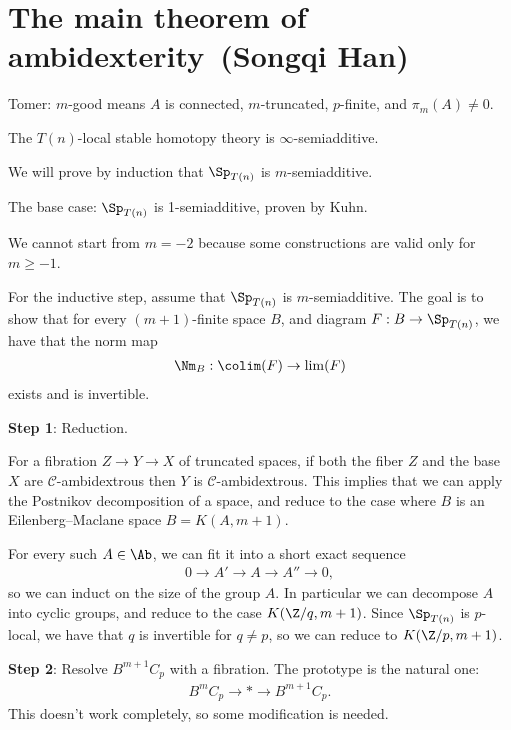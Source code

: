 \renewcommand{\thespeaker}{Songqi Han}
\renewcommand{\thetitle}{The main theorem of ambidexterity}

\section{\thetitle~(\thespeaker)}

Tomer: $m$-good means $A$ is connected, $m$-truncated, $p$-finite, and $\pi_m(A) \ne 0$.


\begin{theorem} The $T(n)$-local stable homotopy theory is $\infty$-semiadditive.
\end{theorem}

We will prove by induction that $\Sp_{T(n)}$ is $m$-semiadditive.

The base case: $\Sp_{T(n)}$ is 1-semiadditive, proven by Kuhn.

\begin{remark} We cannot start from $m=-2$ because some constructions are valid only for $m\ge -1$.
\end{remark}

For the inductive step, assume that $\Sp_{T(n)}$ is $m$-semiadditive. The goal is to show that for every $(m+1)$-finite space $B$, and diagram $F: B \to \Sp_{T(n)}$, we have that the norm map
\begin{align*}
    \Nm_B : \colim(F) \to \lim(F)
\end{align*}
exists and is invertible.

\textbf{Step 1}: Reduction.

For a fibration $Z \to Y \to X$ of truncated spaces, if both the fiber $Z$ and the base $X$ are $\mathscr{C}$-ambidextrous then $Y$ is $\mathscr{C}$-ambidextrous. This implies that we can apply the Postnikov decomposition of a space, and reduce to the case where $B$ is an Eilenberg--Maclane space $B = K(A,m+1)$.

For every such $A\in \Ab$, we can fit it into a short exact sequence
\begin{align*}
    0 \to A' \to A \to A'' \to 0,
\end{align*}
so we can induct on the size of the group $A$. In particular we can decompose $A$ into cyclic groups, and reduce to the case $K(\Z/q, m+1)$. Since $\Sp_{T(n)}$ is $p$-local, we have that $q$ is invertible for $q\ne p$, so we can reduce to $K(\Z/p, m+1)$.

\textbf{Step 2}: Resolve $B^{m+1} C_p$ with a fibration. The prototype is the natural one:
\begin{align*}
    B^m C_p \to \ast \to B^{m+1} C_p.
\end{align*}
This doesn't work completely, so some modification is needed.

